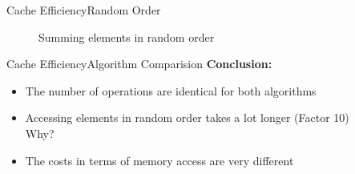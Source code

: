 

%
%  
%
%
%  


\begin{frame}{Cache Efficiency}{Random Order}
  \begin{figure}
    
    \vspace{-1.0em}
    \caption{Summing elements in random order}
    \label{fig:caching:sum_random_order}
  \end{figure}
\end{frame}


\begin{frame}{Cache Efficiency}{Algorithm Comparision}
  \textbf{Conclusion:}
  \begin{itemize}
    \item<2->
      The number of operations are identical for both algorithms
    \item<3->
      Accessing elements in random order takes a lot longer (Factor 10)\\
      {\color{cyan}Why?}
    \item<3->
      The costs in terms of memory access are very different
  \end{itemize}
\end{frame}

